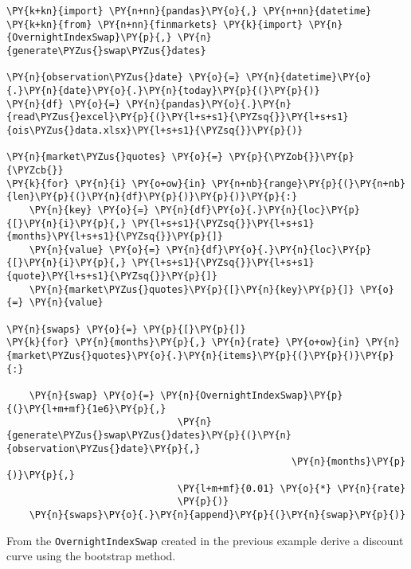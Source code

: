 \begin{Answer}
\begin{tcolorbox}[size=fbox, boxrule=1pt, colback=cellbackground, colframe=cellborder]
\begin{Verbatim}[commandchars=\\\{\}]
\PY{k+kn}{import} \PY{n+nn}{pandas}\PY{o}{,} \PY{n+nn}{datetime}
\PY{k+kn}{from} \PY{n+nn}{finmarkets} \PY{k}{import} \PY{n}{OvernightIndexSwap}\PY{p}{,} \PY{n}{generate\PYZus{}swap\PYZus{}dates}

\PY{n}{observation\PYZus{}date} \PY{o}{=} \PY{n}{datetime}\PY{o}{.}\PY{n}{date}\PY{o}{.}\PY{n}{today}\PY{p}{(}\PY{p}{)}
\PY{n}{df} \PY{o}{=} \PY{n}{pandas}\PY{o}{.}\PY{n}{read\PYZus{}excel}\PY{p}{(}\PY{l+s+s1}{\PYZsq{}}\PY{l+s+s1}{ois\PYZus{}data.xlsx}\PY{l+s+s1}{\PYZsq{}}\PY{p}{)}

\PY{n}{market\PYZus{}quotes} \PY{o}{=} \PY{p}{\PYZob{}}\PY{p}{\PYZcb{}}
\PY{k}{for} \PY{n}{i} \PY{o+ow}{in} \PY{n+nb}{range}\PY{p}{(}\PY{n+nb}{len}\PY{p}{(}\PY{n}{df}\PY{p}{)}\PY{p}{)}\PY{p}{:}
    \PY{n}{key} \PY{o}{=} \PY{n}{df}\PY{o}{.}\PY{n}{loc}\PY{p}{[}\PY{n}{i}\PY{p}{,} \PY{l+s+s1}{\PYZsq{}}\PY{l+s+s1}{months}\PY{l+s+s1}{\PYZsq{}}\PY{p}{]}
    \PY{n}{value} \PY{o}{=} \PY{n}{df}\PY{o}{.}\PY{n}{loc}\PY{p}{[}\PY{n}{i}\PY{p}{,} \PY{l+s+s1}{\PYZsq{}}\PY{l+s+s1}{quote}\PY{l+s+s1}{\PYZsq{}}\PY{p}{]}
    \PY{n}{market\PYZus{}quotes}\PY{p}{[}\PY{n}{key}\PY{p}{]} \PY{o}{=} \PY{n}{value}

\PY{n}{swaps} \PY{o}{=} \PY{p}{[}\PY{p}{]}
\PY{k}{for} \PY{n}{months}\PY{p}{,} \PY{n}{rate} \PY{o+ow}{in} \PY{n}{market\PYZus{}quotes}\PY{o}{.}\PY{n}{items}\PY{p}{(}\PY{p}{)}\PY{p}{:}
        
    \PY{n}{swap} \PY{o}{=} \PY{n}{OvernightIndexSwap}\PY{p}{(}\PY{l+m+mf}{1e6}\PY{p}{,}
                              \PY{n}{generate\PYZus{}swap\PYZus{}dates}\PY{p}{(}\PY{n}{observation\PYZus{}date}\PY{p}{,}
                                                  \PY{n}{months}\PY{p}{)}\PY{p}{,}
                              \PY{l+m+mf}{0.01} \PY{o}{*} \PY{n}{rate}
                              \PY{p}{)}
    \PY{n}{swaps}\PY{o}{.}\PY{n}{append}\PY{p}{(}\PY{n}{swap}\PY{p}{)}
\end{Verbatim}
\end{tcolorbox}
\end{Answer}

\begin{Exercise}[title={(Bootstrapping of Discount Curve)}]
From the \texttt{OvernightIndexSwap} created in the previous example derive a discount curve using the bootstrap method.
\end{Exercise}

